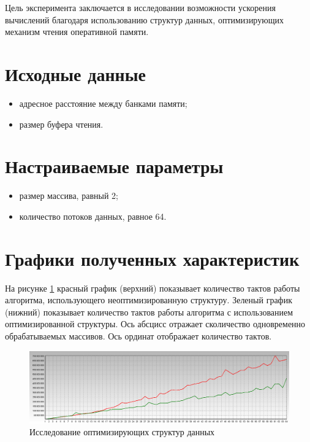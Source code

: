 Цель эксперимента заключается в исследовании возможности ускорения вычислений благодаря использованию структур данных, оптимизирующих механизм чтения оперативной памяти.

\section{Исходные данные}

\begin{itemize}
	\item адресное расстояние между банками памяти;
	\item размер буфера чтения.
\end{itemize}

\section{Настраиваемые параметры}

\begin{itemize}
	\item размер массива, равный 2;
	\item количество потоков данных, равное 64.
\end{itemize}

\section{Графики полученных характеристик}

На рисунке \ref{img:read} красный график (верхний) показывает количество тактов работы алгоритма, использующего неоптимизированную структуру. Зеленый график (нижний) показывает количество тактов работы алгоритма с использованием оптимизированной структуры. Ось абсцисс отражает сколичество одновременно обрабатываемых массивов. Ось ординат отображает количество тактов.

\begin{figure}[H]
	\begin{center}
		\includegraphics[scale=0.3]{img/read.jpg}
	\end{center}
	\captionsetup{justification=centering}
	\caption{Исследование оптимизирующих структур данных}
	\label{img:read}
\end{figure}

